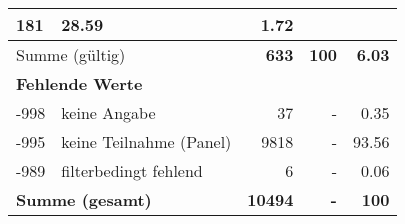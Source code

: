 \begin{longtable}{lXrrr}
       \num{181} &
       \num[round-mode=places,round-precision=2]{28.59} &
         \num[round-mode=places,round-precision=2]{1.72} \\
     \midrule
     \multicolumn{2}{l}{Summe (gültig)} &
       \textbf{\num{633}} &
     \textbf{\num{100}} &
       \textbf{\num[round-mode=places,round-precision=2]{6.03}} \\
     \multicolumn{5}{l}{\textbf{Fehlende Werte}}\\
       -998 &
       keine Angabe &
         \num{37} &
        - &
         \num[round-mode=places,round-precision=2]{0.35} \\
       -995 &
       keine Teilnahme (Panel) &
         \num{9818} &
        - &
         \num[round-mode=places,round-precision=2]{93.56} \\
       -989 &
       filterbedingt fehlend &
         \num{6} &
        - &
         \num[round-mode=places,round-precision=2]{0.06} \\
     \midrule
     \multicolumn{2}{l}{\textbf{Summe (gesamt)}} &
          \textbf{\num{10494}} &
        \textbf{-} &
        \textbf{\num{100}} \\
     \bottomrule
     \end{longtable}
     

